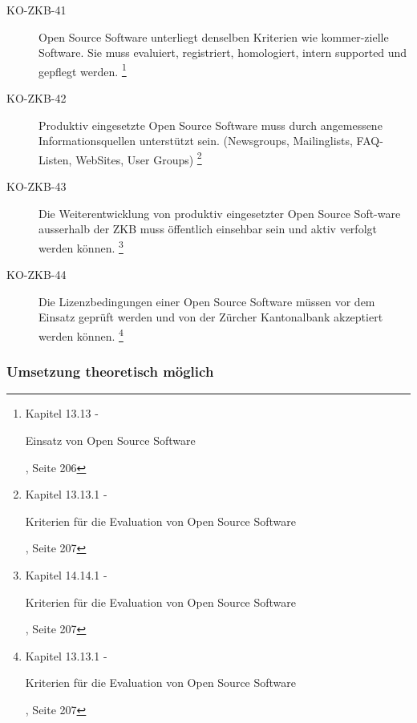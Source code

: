 \documentclass[
11pt, %
a4paper, %
BCOR25mm, %
DIV14, %
footsepline = false, %
headsepline, %
twoside, %
openright,
abstracton, %
listof=totocnumbered, %
bibliography=totocnumbered %
]{scrreprt}
\begin{document}
\begin{description}
    \item[KO-ZKB-41] Open Source Software unterliegt denselben Kriterien wie
    kommer-zielle Software. Sie muss evaluiert, registriert, homologiert, intern
    supported und gepflegt werden.
    \footnote{\cite{ZkbHandbuchDerItArchitektur} Kapitel 13.13 -
    \begin{itshape}Einsatz von Open Source Software\end{itshape}, Seite 206}
    
    \item[KO-ZKB-42] Produktiv eingesetzte Open Source Software muss durch
    angemessene Informationsquellen unterstützt sein. (Newsgroups,
    Mailinglists, FAQ-Listen, WebSites, User Groups)
    \footnote{\cite{ZkbHandbuchDerItArchitektur} Kapitel 13.13.1 -
    \begin{itshape}Kriterien für die Evaluation von Open Source
    Software\end{itshape}, Seite 207}
    
    \item[KO-ZKB-43] Die Weiterentwicklung von produktiv eingesetzter Open
    Source Soft-ware ausserhalb der ZKB muss öffentlich einsehbar sein und aktiv verfolgt werden können.
    \footnote{\cite{ZkbHandbuchDerItArchitektur} Kapitel 14.14.1 -
    \begin{itshape}Kriterien für die Evaluation von Open Source
    Software\end{itshape}, Seite 207}
    
    \item[KO-ZKB-44] Die Lizenzbedingungen einer Open Source Software müssen vor
    dem Einsatz geprüft werden und von der Zürcher Kantonalbank akzeptiert werden
    können.
    \footnote{\cite{ZkbHandbuchDerItArchitektur} Kapitel 13.13.1 -
    \begin{itshape}Kriterien für die Evaluation von Open Source
    Software\end{itshape}, Seite 207}
  \end{description}
  
  \subsubsection{Umsetzung theoretisch möglich}
    
\end{document}
